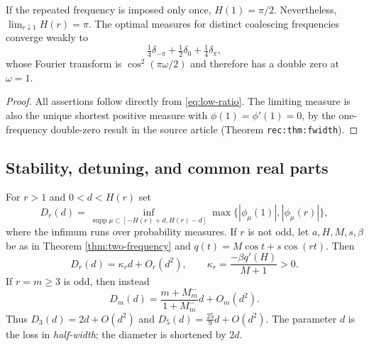 \begin{corollary}
\label{cor:merger}
If the repeated frequency is imposed only once, $H(1)=\pi/2$.
Nevertheless, $\lim_{r\downarrow1}H(r)=\pi$. The optimal measures for
distinct coalescing frequencies converge weakly to
\[
 \tfrac14\delta_{-\pi}+\tfrac12\delta_0+\tfrac14\delta_{\pi},
\]
whose Fourier transform is $\cos^2(\pi\omega/2)$ and therefore has a
double zero at $\omega=1$.
\end{corollary}

\begin{proof}
All assertions follow directly from \eqref{eq:low-ratio}. The limiting
measure is also the unique shortest positive measure with
$\phi(1)=\phi'(1)=0$, by the one-frequency double-zero result in the
source article (Theorem \texttt{rec:thm:fwidth}).
\end{proof}

\subsection{Stability, detuning, and common real parts}

\begin{theorem}
\label{thm:shortening}
For $r>1$ and $0<d<H(r)$ set
\[
 D_r(d)=\inf_{\operatorname{supp}\mu\subset[-H(r)+d,H(r)-d]}
               \max\{|\phi_\mu(1)|,|\phi_\mu(r)|\},
\]
where the infimum runs over probability measures. If $r$ is not odd,
let $a,H,M,s,\beta$ be as in Theorem \ref{thm:two-frequency} and
$q(t)=M\cos t+s\cos(rt)$. Then
\begin{equation}\label{eq:shortening-slope}
 D_r(d)=\kappa_r d+O_r(d^2),\qquad
 \kappa_r=\frac{-\beta q'(H)}{M+1}>0.
\end{equation}
If $r=m\ge3$ is odd, then instead
\begin{equation}\label{eq:odd-shortening}
 D_m(d)=\frac{m+M_m^-}{1+M_m^-}d+O_m(d^2).
\end{equation}
Thus $D_3(d)=2d+O(d^2)$ and $D_5(d)=\tfrac{25}{9}d+O(d^2)$.
The parameter $d$ is the loss in \emph{half-width}; the diameter is
shortened by $2d$.
\end{theorem}

